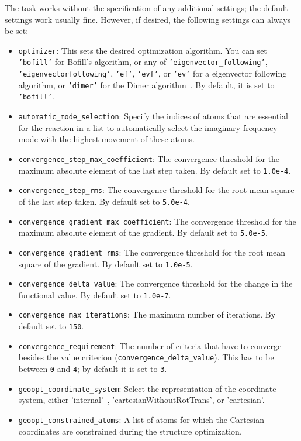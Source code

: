 \documentclass[]{tufte-book}
\begin{document}
The task works without the specification of any additional settings; the default settings work usually fine. However,
if desired, the following settings can always be set:
\begin{itemize}
\item \texttt{optimizer}: This sets the desired optimization algorithm. You can set \texttt{'bofill'} for Bofill's algorithm\cite{bofill1, bofill2},
or any of \texttt{'eigenvector\_following'}, \texttt{'eigenvectorfollowing'}, \texttt{'ef'}, \texttt{'evf'}, or \texttt{'ev'} for a
eigenvector following algorithm, or \texttt{'dimer'} for the Dimer algorithm~\cite{dimer1,dimer2,dimer3}. By default, it is set to \texttt{'bofill'}.
\item \texttt{automatic\_mode\_selection}: Specify the indices of atoms that are essential for the reaction in a list to automatically select the imaginary frequency mode with the highest movement of these atoms.
\item \texttt{convergence\_step\_max\_coefficient}: The convergence threshold for the maximum absolute element of the last step taken.
By default set to \texttt{1.0e-4}.
\item \texttt{convergence\_step\_rms}: The convergence threshold for the root mean square of the last step taken. By default set to
\texttt{5.0e-4}.
\item \texttt{convergence\_gradient\_max\_coefficient}: The convergence threshold for the maximum absolute element of the gradient.
By default set to \texttt{5.0e-5}.
\item \texttt{convergence\_gradient\_rms}: The convergence threshold for the root mean square of the gradient. By default set to
\texttt{1.0e-5}.
\item \texttt{convergence\_delta\_value}: The convergence threshold for the change in the functional value. By default set to
\texttt{1.0e-7}.
\item \texttt{convergence\_max\_iterations}: The maximum number of iterations. By default set to \texttt{150}.
\item \texttt{convergence\_requirement}: The number of criteria that have to converge besides the value criterion
(\texttt{convergence\_delta\_value}). This has to be between \texttt{0} and \texttt{4}; by default it is set to \texttt{3}.
\item \texttt{geoopt\_coordinate\_system}: Select the representation of the coordinate system, either 'internal'~\cite{libirc}, 'cartesianWithoutRotTrans', or 'cartesian'.
\item \texttt{geoopt\_constrained\_atoms}: A list of atoms for which the Cartesian coordinates are constrained during the structure optimization.

\end{itemize}
\end{document}
